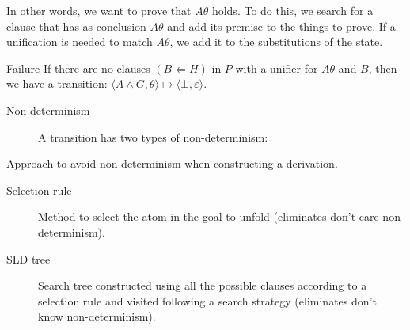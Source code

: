 \begin{description}
\begin{descriptionlist}
                In other words, we want to prove that $A\theta$ holds. 
                To do this, we search for a clause that has as conclusion $A\theta$ and add its premise to the things to prove.
                If a unification is needed to match $A\theta$, we add it to the substitutions of the state.
            \item[Failure] 
                If there are no clauses $(B \Leftarrow H)$ in $P$ with a unifier for $A\theta$ and $B$,
                then we have a transition: $\langle A \land G, \theta \rangle \mapsto \langle \bot, \varepsilon \rangle$.
        \end{descriptionlist}

        \begin{description}
            \item[Non-determinism] A transition has two types of non-determinism:
        \end{description}

    \item[Selective linear definite resolution] 
        Approach to avoid non-determinism when constructing a derivation.
        \begin{description}
            \item[Selection rule] 
                Method to select the atom in the goal to unfold (eliminates don't-care non-determinism).
            \item[SLD tree] 
                Search tree constructed using all the possible clauses according to a selection rule
                and visited following a search strategy (eliminates don't know non-determinism).
        \end{description}


\end{description}

